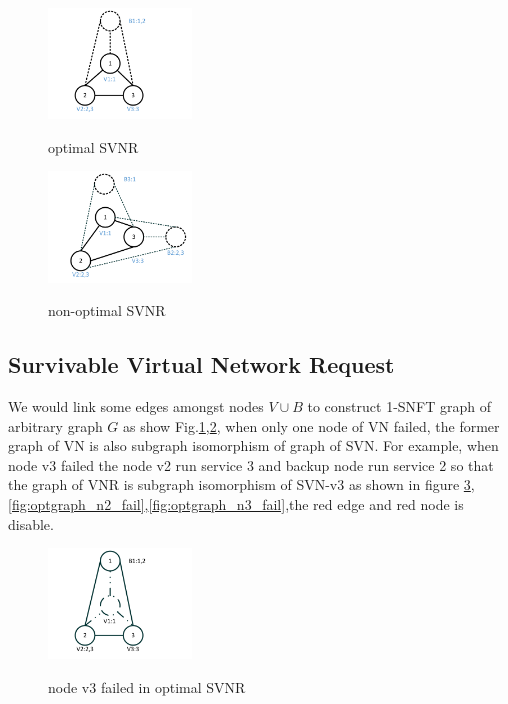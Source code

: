 \begin{figure}
\centering
\includegraphics[width=1.5in]{Fig/optgraph_SVNR}\\
\caption{optimal SVNR}\label{fig:optgraphsvnr}
\end{figure}
\begin{figure}
\centering
\includegraphics[width=1.5in]{Fig/nonoptgraph_SVNR}\\
\caption{non-optimal SVNR}\label{fig:nonoptgraphsvnr}
\end{figure}
\subsection{Survivable Virtual Network Request}
We would link some edges amongst nodes $V\cup B$ to construct 1-SNFT graph of arbitrary graph $G$ as show Fig.\ref{fig:optgraphsvnr},\ref{fig:nonoptgraphsvnr}, when only one node of VN failed, the former graph of VN is also subgraph isomorphism of graph of SVN. For example, when node v3 failed the node v2 run service 3 and backup node run service 2 so that the graph of VNR is subgraph isomorphism of SVN-v3 as shown in figure \ref{fig:optgraph_n1_fail},\ref{fig:optgraph_n2_fail},\ref{fig:optgraph_n3_fail},the red edge and red node is disable.

\begin{figure}
\centering
\includegraphics[width=1.5in]{Fig/SVNR_opt_n1}\\
\caption{node v3 failed in optimal SVNR}\label{fig:optgraph_n1_fail}
\end{figure}

